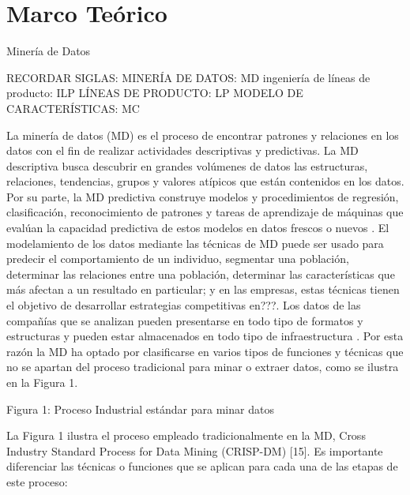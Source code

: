 \chapter*{Marco Teórico}

Minería de Datos

RECORDAR SIGLAS: 
MINERÍA DE DATOS: MD
ingeniería de líneas de producto: ILP
LÍNEAS DE PRODUCTO: LP
MODELO DE CARACTERÍSTICAS: MC

La minería de datos (MD) es el proceso de encontrar patrones y relaciones en los datos con el fin de realizar actividades descriptivas y predictivas. La MD descriptiva busca descubrir en grandes volúmenes de datos las estructuras, relaciones, tendencias, grupos y valores atípicos que están contenidos en los datos. Por su parte, la MD predictiva construye modelos y procedimientos de regresión, clasificación, reconocimiento de patrones y tareas de aprendizaje de máquinas  que evalúan la capacidad predictiva de estos modelos en datos frescos o nuevos \cite{Izenman2006}. 
El modelamiento de los datos mediante las técnicas de MD puede ser usado para predecir el comportamiento de un individuo, segmentar una población, determinar las relaciones entre una población, determinar las características que más afectan a un resultado en particular; y en las empresas, estas técnicas tienen el objetivo de desarrollar estrategias competitivas en???. Los datos de las compañías que se analizan pueden presentarse en todo tipo de formatos y estructuras y pueden estar almacenados en todo tipo de infraestructura \cite{Izenman2006}. Por esta razón la MD ha optado por clasificarse en varios tipos de funciones y técnicas que no se apartan del proceso tradicional para minar o extraer datos, como se ilustra en la Figura 1.

Figura 1: Proceso Industrial estándar para minar datos

La Figura 1 ilustra el proceso empleado tradicionalmente en la MD, Cross Industry Standard Process for Data Mining  (CRISP-DM) [15]. Es importante diferenciar las técnicas o funciones que se aplican para cada una de las etapas de este proceso:

